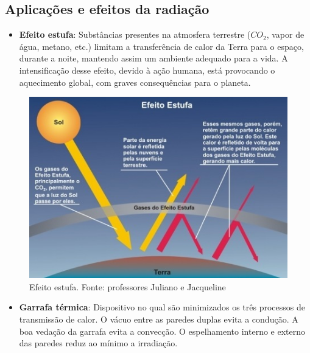 \documentclass[12pt,twoside]{article}
\begin{document}
\hypertarget{x-aplicações-e-efeitos-da-radiação}{\subsection{Aplicações e efeitos da radiação}}
\begin{itemize}

\item \textbf{Efeito estufa}: Substâncias presentes na atmosfera terrestre ($CO_{2}$, vapor de água, metano, etc.​) limitam a transferência de calor da Terra para o espaço, durante a noite, mantendo assim um ambiente adequado para a vida. A intensificação desse efeito, devido à ação humana, está provocando o aquecimento global, com graves consequências para o planeta.

\end{itemize}


\begin{figure}[ht]{}
\centering\includegraphics[width=2.5truein]{efeito-estufa2.jpg}
\caption{Efeito estufa. Fonte: professores Juliano e Jacqueline}

\end{figure}

\begin{itemize}

\item \textbf{Garrafa térmica}: Dispositivo no qual são minimizados os três processos de transmissão de calor. O vácuo entre as paredes duplas evita a condução. A boa vedação da garrafa evita a convecção. O espelhamento interno e externo das paredes reduz ao mínimo a irradiação.

\end{itemize}
\end{document}
